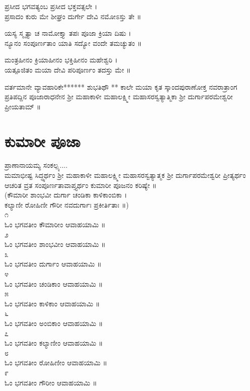 ಪ್ರಸೀದ ಭಗವತ್ಯಂಬ ಪ್ರಸೀದ ಭಕ್ತವತ್ಸಲೇ ।\\
ಪ್ರಸಾದಂ ಕುರು ಮೇ ಶೀಘ್ರಂ ದುರ್ಗೇ ದೇವಿ ನಮೋಽಸ್ತು ತೇ ॥

ಯಸ್ಯ ಸ್ಮೃತ್ಯಾ ಚ ನಾಮೋಕ್ತ್ಯಾ  ತಪಃ ಪೂಜಾ ಕ್ರಿಯಾ ದಿಷು ।\\
ನ್ಯೂನಂ ಸಂಪೂರ್ಣತಾಂ ಯಾತಿ ಸದ್ಯೋ ವಂದೇ ತಮಚ್ಯುತಂ ॥

ಮಂತ್ರಹೀನಂ ಕ್ರಿಯಾಹೀನಂ ಭಕ್ತಿಹೀನಂ ಮಹೇಶ್ವರಿ ।\\
ಯತ್ಪೂಜಿತಂ ಮಯಾ ದೇವಿ ಪರಿಪೂರ್ಣಂ ತದಸ್ತು ಮೇ ॥

ವರ್ತಮಾನೇ ವ್ಯಾವಹಾರಿಕೇ****** ಶುಭತಿಥೌ ** ಕಾಲೇ 
ಮಯಾ ಕೃತ ಸ್ಕಾಂದಪುರಾಣೋಕ್ತ ನವರಾತ್ರಾಂಗ ಪ್ರತಿಪದ್ದಿನ 
ಪೂಜಾರಾಧನೇನ ಶ್ರೀ ಮಹಾಕಾಳೀ ಮಹಾಲಕ್ಷ್ಮೀ ಮಹಾಸರಸ್ವತ್ಯಾತ್ಮಿಕಾ ಶ್ರೀ ದುರ್ಗಾಪರಮೇಶ್ವರೀ ಪ್ರೀಯತಾಮ್ ॥
\section{ಕುಮಾರೀ ಪೂಜಾ}
ಪ್ರಾಣಾನಾಯಮ್ಯ ಸಂಕಲ್ಪ್ಯ....\\
ಮಮಾಭೀಷ್ಟ ಸಿದ್ಧ್ಯರ್ಥಂ ಶ್ರೀ ಮಹಾಕಾಳೀ ಮಹಾಲಕ್ಷ್ಮೀ ಮಹಾಸರಸ್ವತ್ಯಾತ್ಮಕ ಶ್ರೀ ದುರ್ಗಾಪರಮೇಶ್ವರೀ ಪ್ರೀತ್ಯರ್ಥಂ ಆಚರಿತ ವ್ರತ ಸಂಪೂರ್ಣತಾವಾಪ್ತ್ಯರ್ಥಂ ಕುಮಾರೀ ಪೂಜನಂ ಕರಿಷ್ಯೇ ॥\\
(ಕೌಮಾರೀ ಶಾಂಭವೀ ದುರ್ಗಾ ಚಂಡಿಕಾ ಕಾಳಿಕಾಂಬಿಕಾ ।\\
ಕಲ್ಯಾಣೀ ರೋಹಿಣೀ ಗೌರೀ ನವದುರ್ಗಾಃ ಪ್ರಕೀರ್ತಿತಾಃ ॥)\\
೧\\
ಓಂ ಭಗವತೀಂ ಕೌಮಾರೀಂ ಆವಾಹಯಾಮಿ ॥\\
೨\\
ಓಂ ಭಗವತೀಂ ಶಾಂಭವೀಂ ಆವಾಹಯಾಮಿ ॥\\
೩\\
ಓಂ ಭಗವತೀಂ ದುರ್ಗಾಂ ಆವಾಹಯಾಮಿ ॥\\
೪\\
ಓಂ ಭಗವತೀಂ ಚಂಡಿಕಾಂ ಆವಾಹಯಾಮಿ ॥\\
೫\\
ಓಂ ಭಗವತೀಂ ಕಾಳಿಕಾಂ ಆವಾಹಯಾಮಿ ॥\\
೬\\
ಓಂ ಭಗವತೀಂ ಅಂಬಿಕಾಂ ಆವಾಹಯಾಮಿ ॥\\
೭\\
ಓಂ ಭಗವತೀಂ ಕಲ್ಯಾಣೀಂ ಆವಾಹಯಾಮಿ ॥\\
೮\\
ಓಂ ಭಗವತೀಂ ರೋಹಿಣೀಂ ಆವಾಹಯಾಮಿ ॥\\
೯\\
ಓಂ ಭಗವತೀಂ ಗೌರೀಂ ಆವಾಹಯಾಮಿ ॥

